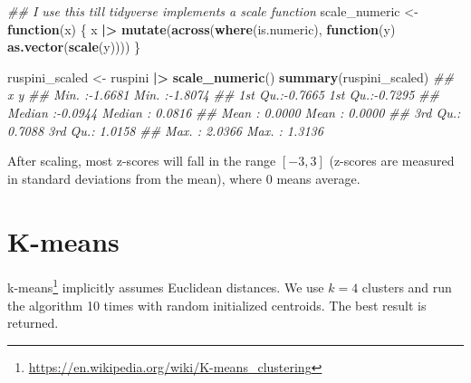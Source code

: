 \documentclass[
  notitlepage]{book}
\newenvironment{Shaded}{\begin{snugshade}}{\end{snugshade}}
\newcommand{\CommentTok}[1]{\textcolor[rgb]{0.56,0.35,0.01}{\textit{#1}}}
\newcommand{\ControlFlowTok}[1]{\textcolor[rgb]{0.13,0.29,0.53}{\textbf{#1}}}
\newcommand{\ErrorTok}[1]{\textcolor[rgb]{0.64,0.00,0.00}{\textbf{#1}}}
\newcommand{\KeywordTok}[1]{\textcolor[rgb]{0.13,0.29,0.53}{\textbf{#1}}}
\newcommand{\NormalTok}[1]{#1}
\newcommand{\OperatorTok}[1]{\textcolor[rgb]{0.81,0.36,0.00}{\textbf{#1}}}
\newcommand{\StringTok}[1]{\textcolor[rgb]{0.31,0.60,0.02}{#1}}
\DeclareRobustCommand{\href}[2]{#2\footnote{\url{#1}}}
\begin{document}
\begin{Shaded}
\begin{Highlighting}[]
\CommentTok{\#\# I use this till tidyverse implements a scale function}
\NormalTok{scale\_numeric \textless{}{-}}\StringTok{ }\ControlFlowTok{function}\NormalTok{(x) \{}
\NormalTok{  x }\OperatorTok{|}\ErrorTok{\textgreater{}}\StringTok{ }\KeywordTok{mutate}\NormalTok{(}\KeywordTok{across}\NormalTok{(}\KeywordTok{where}\NormalTok{(is.numeric), }
                     \ControlFlowTok{function}\NormalTok{(y) }\KeywordTok{as.vector}\NormalTok{(}\KeywordTok{scale}\NormalTok{(y))))}
\NormalTok{\}}
\end{Highlighting}
\end{Shaded}

\begin{Shaded}
\begin{Highlighting}[]
\NormalTok{ruspini\_scaled \textless{}{-}}\StringTok{ }\NormalTok{ruspini }\OperatorTok{|}\ErrorTok{\textgreater{}}\StringTok{ }
\StringTok{  }\KeywordTok{scale\_numeric}\NormalTok{()}
\KeywordTok{summary}\NormalTok{(ruspini\_scaled)}
\CommentTok{\#\#        x                 y          }
\CommentTok{\#\#  Min.   :{-}1.6681   Min.   :{-}1.8074  }
\CommentTok{\#\#  1st Qu.:{-}0.7665   1st Qu.:{-}0.7295  }
\CommentTok{\#\#  Median :{-}0.0944   Median : 0.0816  }
\CommentTok{\#\#  Mean   : 0.0000   Mean   : 0.0000  }
\CommentTok{\#\#  3rd Qu.: 0.7088   3rd Qu.: 1.0158  }
\CommentTok{\#\#  Max.   : 2.0366   Max.   : 1.3136}
\end{Highlighting}
\end{Shaded}

After scaling, most z-scores will fall in the range \([-3,3]\) (z-scores
are measured in standard deviations from the mean), where \(0\) means
average.

\hypertarget{k-means}{%
\section{K-means}\label{k-means}}

\href{https://en.wikipedia.org/wiki/K-means_clustering}{k-means} implicitly
assumes Euclidean distances. We use \(k = 4\) clusters and run the
algorithm 10 times with random initialized centroids. The best result is
returned.
\end{document}

